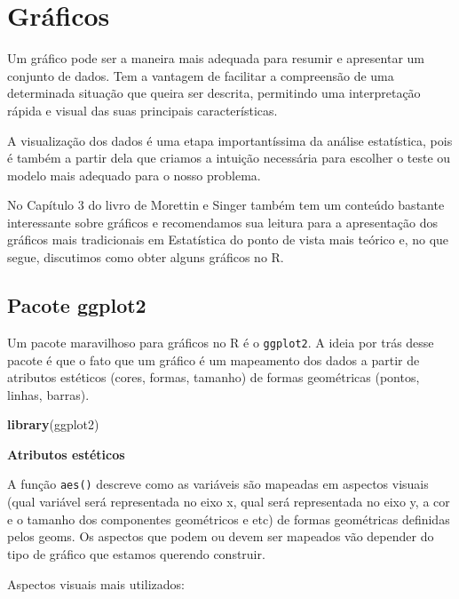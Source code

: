 \documentclass[
]{book}
\newenvironment{Shaded}{\begin{snugshade}}{\end{snugshade}}
\newcommand{\KeywordTok}[1]{\textcolor[rgb]{0.13,0.29,0.53}{\textbf{#1}}}
\newcommand{\NormalTok}[1]{#1}
\begin{document}
\hypertarget{gruxe1ficos}{%
\section{Gráficos}\label{gruxe1ficos}}

Um gráfico pode ser a maneira mais adequada para resumir e apresentar um conjunto de dados. Tem a vantagem de facilitar a compreensão de uma determinada situação que queira ser descrita, permitindo uma interpretação rápida e visual das suas principais características.

A visualização dos dados é uma etapa importantíssima da análise estatística, pois é também a partir dela que criamos a intuição necessária para escolher o teste ou modelo mais adequado para o nosso problema.

No Capítulo 3 do livro de Morettin e Singer também tem um conteúdo bastante interessante sobre gráficos e recomendamos sua leitura para a apresentação dos gráficos mais tradicionais em Estatística do ponto de vista mais teórico e, no que segue, discutimos como obter alguns gráficos no R.

\hypertarget{pacote-ggplot2}{%
\subsection{Pacote ggplot2}\label{pacote-ggplot2}}

Um pacote maravilhoso para gráficos no R é o \texttt{ggplot2}. A ideia por trás desse pacote é que o fato que um gráfico é um mapeamento dos dados a partir de atributos estéticos (cores, formas, tamanho) de formas geométricas (pontos, linhas, barras).

\begin{Shaded}
\begin{Highlighting}[]
\KeywordTok{library}\NormalTok{(ggplot2)}
\end{Highlighting}
\end{Shaded}

\textbf{Atributos estéticos}

A função \texttt{aes()} descreve como as variáveis são mapeadas em aspectos visuais (qual variável será representada no eixo x, qual será representada no eixo y, a cor e o tamanho dos componentes geométricos e etc) de formas geométricas definidas pelos geoms. Os aspectos que podem ou devem ser mapeados vão depender do tipo de gráfico que estamos querendo construir.

Aspectos visuais mais utilizados:
\end{document}
